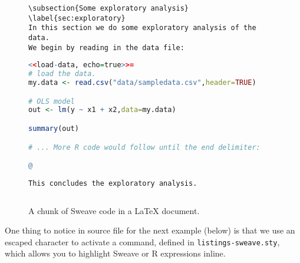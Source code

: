 \documentclass[11pt]{article}
\begin{document}
\begin{figure}[h!]
\begin{lstlisting}[style=sweave-top]

\end{lstlisting} 
\begin{lstlisting}[language={[latex]tex},numbers=none,style=sweave-tex]   
\subsection{Some exploratory analysis}
\label{sec:exploratory}
In this section we do some exploratory analysis of the data. 
We begin by reading in the data file:
\end{lstlisting}
\begin{lstlisting}[language=R,numbers=none,style=sweave-r] 
<<load-data, echo=true>>=
# load the data. 
my.data <- read.csv("data/sampledata.csv",header=TRUE)

# OLS model
out <- lm(y ~ x1 + x2,data=my.data)

summary(out)

# ... More R code would follow until the end delimiter:

@ 
\end{lstlisting}
\begin{lstlisting}[language={[latex]tex},numbers=none,style=sweave-tex] 
% now we are back to normal latex 
This concludes the exploratory analysis. 
\end{lstlisting} 
\begin{lstlisting}[style=sweave-bottom]

\end{lstlisting}
  \caption{A chunk of Sweave code in a LaTeX document.}
\label{fig:codechunk}
\end{figure}

One thing to notice in source file for the next example (below) is that we use an escaped character to activate a command, defined in \texttt{listings-sweave.sty}, which allows you to highlight Sweave or R expressions inline. 
\end{document}
